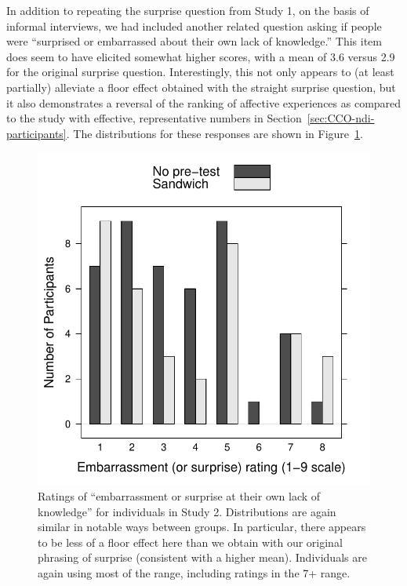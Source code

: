 In addition to repeating the surprise question from Study 1, on the basis of
informal interviews, we had included another related question asking if people
were “surprised or embarrassed about their own lack of knowledge.” This item
does seem to have elicited somewhat higher scores, with a mean of 3.6 versus 2.9
for the original surprise question. Interestingly, this not only appears to (at
least partially) alleviate a floor effect obtained with the straight surprise
question, but it also demonstrates a reversal of the ranking of affective
experiences as compared to the study with effective, representative numbers in
Section~\ref{sec:CCO-ndi-participants}. The distributions for these responses
are shown in Figure~\ref{fig:rpp-mech-embarrass}.

\begin{figure}
    \centering
    \includegraphics{RPP-mech-embarrass-by-group.pdf}
    \caption{Ratings of “embarrassment or surprise at their own lack of
        knowledge” for individuals in Study 2. Distributions are again similar in
        notable ways between groups. In particular, there appears to be less of
        a floor effect here than we obtain with our original phrasing of
        surprise (consistent with a higher mean).  Individuals are again using
        most of the range, including ratings in the 7+ range.}
    \label{fig:rpp-mech-embarrass}
\end{figure}


